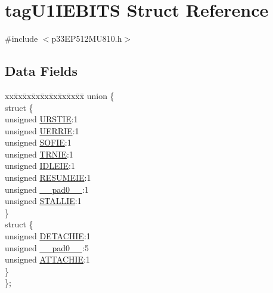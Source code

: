 \hypertarget{structtag_u1_i_e_b_i_t_s}{}\section{tag\+U1\+I\+E\+B\+I\+TS Struct Reference}
\label{structtag_u1_i_e_b_i_t_s}


{\ttfamily \#include $<$p33\+E\+P512\+M\+U810.\+h$>$}

\subsection*{Data Fields}
\begin{DoxyCompactItemize}
\item 
\begin{tabbing}
xx\=xx\=xx\=xx\=xx\=xx\=xx\=xx\=xx\=\kill
union \{\\
\>struct \{\\
\>\>unsigned \hyperlink{structtag_u1_i_e_b_i_t_s_a05e9afc9e0f21fd49c3288106894f01c}{URSTIE}:1\\
\>\>unsigned \hyperlink{structtag_u1_i_e_b_i_t_s_ac68b687acc9126f4b2ae0812da206948}{UERRIE}:1\\
\>\>unsigned \hyperlink{structtag_u1_i_e_b_i_t_s_a2050378630d2a8d2fa63e9a4106482d9}{SOFIE}:1\\
\>\>unsigned \hyperlink{structtag_u1_i_e_b_i_t_s_a9cf15ae0a585d5e50b84c3221cdd5430}{TRNIE}:1\\
\>\>unsigned \hyperlink{structtag_u1_i_e_b_i_t_s_ab8e709d0b730c4a61045c277b7cc857f}{IDLEIE}:1\\
\>\>unsigned \hyperlink{structtag_u1_i_e_b_i_t_s_a142d23a7952b0f31c7eaf2c3e9629855}{RESUMEIE}:1\\
\>\>unsigned \hyperlink{structtag_u1_i_e_b_i_t_s_adf71f3d8410c1f1dbbc96680a92c49af}{\_\_pad0\_\_}:1\\
\>\>unsigned \hyperlink{structtag_u1_i_e_b_i_t_s_a26b89e84db8988c1660268fb2cbfbf9b}{STALLIE}:1\\
\>\} \\
\>struct \{\\
\>\>unsigned \hyperlink{structtag_u1_i_e_b_i_t_s_ac8bdecca68de949572cf9967d57e39d9}{DETACHIE}:1\\
\>\>unsigned \hyperlink{structtag_u1_i_e_b_i_t_s_adf71f3d8410c1f1dbbc96680a92c49af}{\_\_pad0\_\_}:5\\
\>\>unsigned \hyperlink{structtag_u1_i_e_b_i_t_s_a5900c0054b1d0122af8168aa63c6b98b}{ATTACHIE}:1\\
\>\} \\
\}; \\

\end{tabbing}\end{DoxyCompactItemize}


